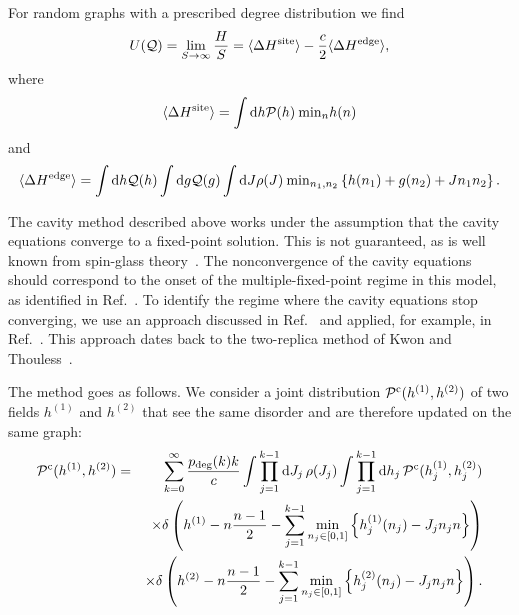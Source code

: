 \documentclass[11pt,a4paper]{article}
\begin{document}
For random graphs with a prescribed degree distribution we find 
\begin{equation}
U(\mathcal{Q}) = \lim_{S\rightarrow\infty} \frac{H}{S} = \langle \Delta H^{\rm site}\rangle - \frac{c}{2} \langle \Delta H^{\rm edge} \rangle,
\end{equation}
where 
\begin{eqnarray}
\langle \Delta H^{\rm site}\rangle =  \int {\rm d}h \mathcal{P}(h) \: {\rm min}_n h(n) 
\end{eqnarray}
and 
\begin{equation}
\langle \Delta H^{\rm edge}\rangle =  \int {\rm d}h \mathcal{Q}(h)\int {\rm d}g \mathcal{Q}(g) \int {\rm d}J \rho(J)\: {\rm min}_{n_1,n_2} \left\{h(n_1) +  g(n_2) + J n_1n_2\right\} .
\end{equation}




The cavity method described above works under the assumption that the cavity equations converge to a fixed-point solution. This is not guaranteed, as is well known from spin-glass theory~\cite{mezard2003cavity}. The nonconvergence of the cavity equations should correspond to the onset of the multiple-fixed-point regime in this model, as identified in Ref.~\cite{tonolo2025generalized}. To identify the regime where the cavity equations stop converging, we use an approach discussed in Ref.~\cite{aldous2005survey} and applied, for example, in Ref.~\cite{neri2010phase}. This approach dates back to the two-replica method of Kwon and Thouless~\cite{kwon1991spin}.

The method goes as follows. We consider a joint distribution $\mathcal{P}^{\rm c}(h^{(1)},h^{(2)})$ of two fields $h^{(1)}$ and $h^{(2)}$ that see the same disorder and are therefore updated on the same graph:
\begin{eqnarray}
    \mathcal{P}^{\rm c}(h^{(1)},h^{(2)}) &=& \sum^{\infty}_{k=0} \frac{p_{\rm deg}(k)k}{c} \int \prod^{k-1}_{j=1} \mathrm{d} J_j \, \rho(J_j) \int \prod^{k-1}_{j=1} \mathrm{d}h_j \, \mathcal{P}^{\rm c}(h^{(1)}_j,h^{(2)}_j)
    \nonumber\\
    && \times
    \delta\left(h^{(1)} - n\frac{n-1}{2} - \sum^{k-1}_{j=1}\min_{n_j \in [0,1]} \left\{h^{(1)}_j(n_j)-J_{j}n_jn\right\} \right)
    \nonumber\\
    && \times
    \delta\left(h^{(2)} - n\frac{n-1}{2} - \sum^{k-1}_{j=1}\min_{n_j\in [0,1]} \left\{h^{(2)}_j(n_j)-J_{j}n_jn\right\} \right).
    \label{eq:stabTwo}
\end{eqnarray}
\end{document}
